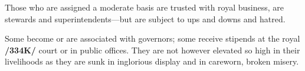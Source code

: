 Those who are assigned a moderate basis are trusted with royal business, are stewards and superintendents—but are subject to ups and downs and hatred. 

Some become or are associated with governors; some receive stipends at the royal \textbf{/334K/} court or in public offices. They are not however elevated so high in their livelihoods as they are sunk in
inglorious display and in careworn, broken misery.

\newpage